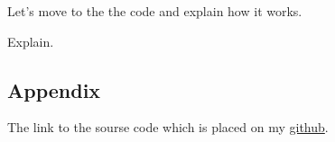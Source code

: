 \documentclass[%
12pt, %
final, %
oneside, %
onecolumn, %
centertags]{article} %
\theoremstyle{plain}
\theoremstyle{definition}
\theoremstyle{remark}
\begin{document}

Let's move to the the code and explain how it works.



Explain. 



\subsection{Appendix}

The link to the sourse code which is placed on my \href{https://github.com/aptmess/parallel_algorithms}{github}.
\end{document}
